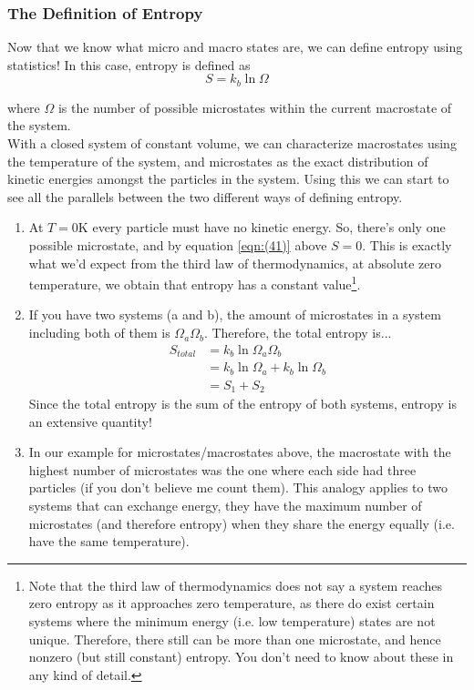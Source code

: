 
\subsubsection{The Definition of Entropy}
Now that we know what micro and macro states are, we can define entropy using statistics! In this case, entropy is defined as
\begin{equation}
    \label{eqn:(41)}
    S=k_{b}\ln{\Omega}
\end{equation}

where $\Omega$ is the number of possible microstates within the current macrostate of the system. \\
With a closed system of constant volume, we can characterize macrostates using the temperature of the system, and microstates as the exact distribution of kinetic energies amongst the particles in the system. Using this we can start to see all the parallels between the two different ways of defining entropy.
\begin{enumerate}
    \item At $T=0\textrm{K}$ every particle must have no kinetic energy. So, there's only one possible microstate, and by equation \ref{eqn:(41)} above $S=0$. This is exactly what we'd expect from the third law of thermodynamics, at absolute zero temperature, we obtain that entropy has a constant value\footnote{Note that the third law of thermodynamics does not say a system reaches zero entropy as it approaches zero temperature, as there do exist certain systems where the minimum energy (i.e. low temperature) states are not unique. Therefore, there still can be more than one microstate, and hence nonzero (but still constant) entropy. You don't need to know about these in any kind of detail.}.
    \item If you have two systems (a and b), the amount of microstates in a system including both of them is $\Omega_{a}\Omega_{b}$. Therefore, the total entropy is...
    \begin{align*}
        S_{total}&=k_{b}\ln{\Omega_{a}\Omega_{b}} \\
        &=k_{b}\ln{\Omega_{a}}+k_{b}\ln{\Omega_{b}} \\
        &=S_{1}+S_{2}
    \end{align*}
    Since the total entropy is the sum of the entropy of both systems, entropy is an extensive quantity!
    \item In our example for microstates/macrostates above, the macrostate with the highest number of microstates was the one where each side had three particles (if you don't believe me count them). This analogy applies to two systems that can exchange energy, they have the maximum number of microstates (and therefore entropy) when they share the energy equally (i.e. have the same temperature). 
\end{enumerate}
